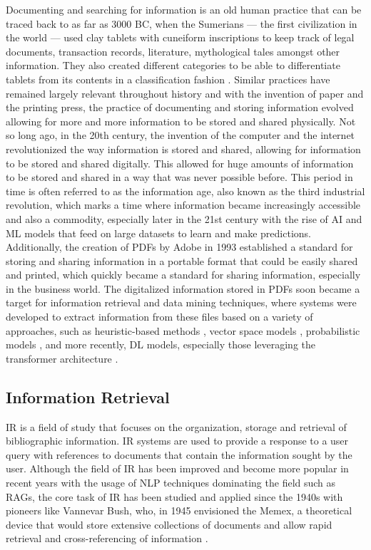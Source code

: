 \documentclass[english, 12pt, a4paper, elec, utf8, a-2b, online]{aaltothesis}
\begin{document}
Documenting and searching for information is an old human practice that can be traced back to as far as 3000 BC, when the Sumerians --- the first civilization in the world --- used clay tablets with cuneiform inscriptions to keep track of legal documents, transaction records, literature, mythological tales amongst other information.
They also created different categories to be able to differentiate tablets from its contents in a classification fashion \cite{finkel2015cuneiform}.
Similar practices have remained largely relevant throughout history and with the invention of paper and the printing press, the practice of documenting and storing information evolved allowing for more and more information to be stored and shared physically.
Not so long ago, in the 20th century, the invention of the computer and the internet revolutionized the way information is stored and shared, allowing for information to be stored and shared digitally.
This allowed for huge amounts of information to be stored and shared in a way that was never possible before.
This period in time is often referred to as the information age, also known as the third industrial revolution, which marks a time where information became increasingly accessible and also a commodity, especially later in the 21st century with the rise of \ac{AI} and \ac{ML} models that feed on large datasets to learn and make predictions.
Additionally, the creation of \ac{PDF}s by Adobe in 1993 \cite{adobe2023pdftimeline} established a standard for storing and sharing information in a portable format that could be easily shared and printed, which quickly became a standard for sharing information, especially in the business world.
The digitalized information stored in \ac{PDF}s soon became a target for information retrieval and data mining techniques, where systems were developed to extract information from these files based on a variety of approaches, such as heuristic-based methods \cite{table_extraction_conditional_pinto_2003, PENG2006963, Fang2004}, vector space models \cite{Salton1975, Wong1987}, probabilistic models \cite{Maron1960}, and more recently, \ac{DL} models, especially those leveraging the transformer architecture \cite{Wang2021, Li2022, Li2023, Xu2020}.

\subsection{Information Retrieval}

\ac{IR} is a field of study that focuses on the organization, storage and retrieval of bibliographic information.
\ac{IR} systems are used to provide a response to a user query with references to documents that contain the information sought by the user.
Although the field of \ac{IR} has been improved and become more popular in recent years with the usage of \ac{NLP} techniques dominating the field such as \ac{RAG}s, the core task of \ac{IR} has been studied and applied since the 1940s with pioneers like Vannevar Bush, who, in 1945 envisioned the Memex, a theoretical device that would store extensive collections of documents and allow rapid retrieval and cross-referencing of information \cite{Bush1945As}.
\end{document}
